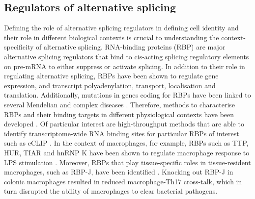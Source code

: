 \subsection{Regulators of alternative splicing}
Defining the role of alternative splicing regulators in defining cell identity and their role in different biological contexts is crucial to understanding the context-specificity of alternative splicing. RNA-binding proteins (RBP) are major alternative splicing regulators that bind to cis-acting splicing regulatory elements on pre-mRNA to either suppress or activate splicing. In addition to their role in regulating alternative splicing, RBPs have been shown to regulate gene expression, and transcript polyadenylation, transport, localisation and translation. Additionally, mutations in genes coding for RBPs have been linked to several Mendelian and complex diseases \cite{Nussbacher2015-zl,Castello2013-ml}. Therefore, methods to characterise RBPs and their binding targets in different physiological contexts have been developed \cite{Wang2012-ni,Wang2013-fb,Van_Nostrand2016-ky}. Of particular interest are high-throughput methods that are able to identify transcriptome-wide RNA binding sites for particular RBPs of interest such as eCLIP \cite{Van_Nostrand2016-ky}. In the context of macrophages, for example, RBPs such as TTP, HUR, TIAR and hnRNP K have been shown to regulate macrophage response to LPS stimulation \cite{Ostareck2019-rp}. Moreover, RBPs that play tissue-specific roles in tissue-resident macrophages, such as RBP-J, have been identified \cite{Kang2020-xl}. Knocking out RBP-J in colonic macrophages resulted in reduced macrophage-Th17 cross-talk, which in turn disrupted the ability of macrophages to clear bacterial pathogens. \\

